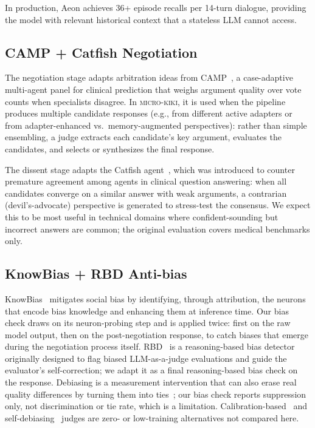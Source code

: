 \documentclass[11pt,a4paper]{article}
\begin{document}
In production, Aeon achieves 36+ episode recalls per 14-turn dialogue, providing the model with relevant historical context that a stateless LLM cannot access.

\subsection{CAMP + Catfish Negotiation}

The negotiation stage adapts arbitration ideas from CAMP~\citep{camp2026}, a case-adaptive multi-agent panel for clinical prediction that weighs argument quality over vote counts when specialists disagree. In \textsc{micro-kiki}, it is used when the pipeline produces multiple candidate responses (e.g., from different active adapters or from adapter-enhanced vs.\ memory-augmented perspectives): rather than simple ensembling, a judge extracts each candidate's key argument, evaluates the candidates, and selects or synthesizes the final response.

The dissent stage adapts the Catfish agent~\citep{catfish2025}, which was introduced to counter premature agreement among agents in clinical question answering: when all candidates converge on a similar answer with weak arguments, a contrarian (devil's-advocate) perspective is generated to stress-test the consensus. We expect this to be most useful in technical domains where confident-sounding but incorrect answers are common; the original evaluation covers medical benchmarks only.

\subsection{KnowBias + RBD Anti-bias}

KnowBias~\citep{knowbias2025} mitigates social bias by identifying, through attribution, the neurons that encode bias knowledge and enhancing them at inference time. Our bias check draws on its neuron-probing step and is applied twice: first on the raw model output, then on the post-negotiation response, to catch biases that emerge during the negotiation process itself. RBD~\citep{rbd2025} is a reasoning-based bias detector originally designed to flag biased LLM-as-a-judge evaluations and guide the evaluator's self-correction; we adapt it as a final reasoning-based bias check on the response. Debiasing is a measurement intervention that can also erase real quality differences by turning them into ties~\citep{zhao2026debias}; our bias check reports suppression only, not discrimination or tie rate, which is a limitation. Calibration-based~\citep{barbera2026callm} and self-debiasing~\citep{yin2026selfdebias} judges are zero- or low-training alternatives not compared here.
\end{document}
